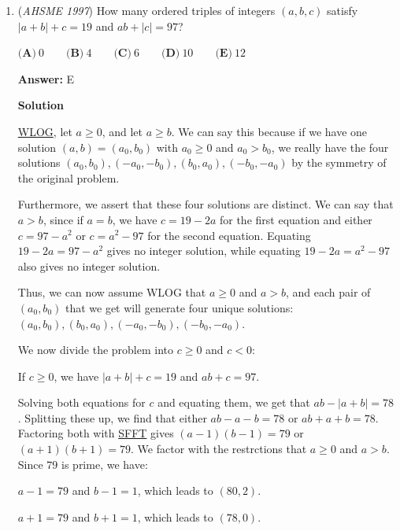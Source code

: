 \begin{enumerate}
 To confirm that our original period works, we may see that $f(18) = -6$, $f(19) = -7$, $f(20) = -8$, $f(21) = -4$, $f(22) = -4$, $f(23) = -4$, and $f(24) = -4$.  Finally, $f(25) = 1$, which is indeed the same as $f(1)$.

 


	\item (\textit{AHSME 1997}) How many ordered triples of integers $(a,b,c)$ satisfy $|a+b|+c = 19$ and $ab+|c| = 97$? 


 $\textbf{(A)}\ 0\qquad\textbf{(B)}\ 4\qquad\textbf{(C)}\ 6\qquad\textbf{(D)}\ 10\qquad\textbf{(E)}\ 12$

 \textbf{Answer: }E



\textbf{Solution}

\href{https://artofproblemsolving.com/wiki/index.php?title=WLOG}{WLOG}, let $a \ge 0$, and let $a \ge b$.  We can say this because if we have one solution $(a,b) = (a_0, b_0)$ with $a_0 \ge 0$ and $a_0 > b_0$, we really have the four solutions $(a_0, b_0), (-a_0, -b_0), (b_0, a_0), (-b_0, -a_0)$ by the symmetry of the original problem.  

 Furthermore, we assert that these four solutions are distinct.  We can say that $a > b$, since if $a=b$, we have $c = 19 - 2a$ for the first equation and either $c = 97 - a^2$ or $c = a^2 - 97$ for the second equation.  Equating $19 - 2a = 97 - a^2$ gives no integer solution, while equating $19 - 2a = a^2 - 97$ also gives no integer solution.

 Thus, we can now assume WLOG that $a \ge 0$ and $a > b$, and each pair of $(a_0,b_0)$ that we get will generate four unique solutions:  $(a_0, b_0), (b_0, a_0), (-a_0, -b_0), (-b_0, -a_0)$.

 
We now divide the problem into $c \ge 0$ and $c < 0$:

 If $c \ge 0$, we have $|a + b| + c = 19$ and $ab + c = 97$.

 Solving both equations for $c$ and equating them, we get that $ab - |a + b| = 78$.  Splitting these up, we find that either $ab - a - b = 78$ or $ab + a+ b = 78$.  Factoring both with \href{https://artofproblemsolving.com/wiki/index.php?title=SFFT}{SFFT} gives $(a-1)(b-1) = 79$ or $(a +1)(b+1) = 79$.  We factor with the restrctions that $a \ge 0$ and $a > b$.  Since $79$ is prime, we have:

 $a - 1 = 79$ and $b - 1 = 1$, which leads to $(80,2)$.

 $a + 1 = 79$ and $b + 1 = 1$, which leads to $(78, 0)$.


\end{enumerate}
